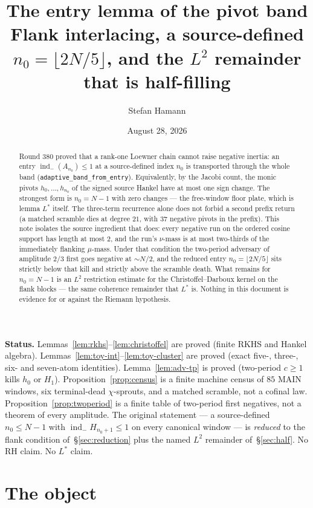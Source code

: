 \documentclass[11pt]{article}
\title{\bfseries The entry lemma of the pivot band\\[2mm]
\large Flank interlacing, a source-defined $n_0=\lfloor 2N/5\rfloor$,
and the $L^2$ remainder that is half-filling}
\author{Stefan Hamann}
\date{August 28, 2026}
\theoremstyle{remark}
\newcommand{\indm}{\operatorname{ind}_{-}}
\begin{document}
\maketitle

\begin{abstract}\noindent
Round 380 proved that a rank-one Loewner chain cannot raise negative
inertia: an entry $\indm(A_{n_0})\le 1$ at a source-defined index
$n_0$ is transported through the whole band
(\texttt{adaptive\_band\_from\_entry}).  Equivalently, by the Jacobi
count, the monic pivots $h_0,\ldots,h_{n_0}$ of the signed source
Hankel have at most one sign change.  The strongest form is
$n_0=N-1$ with zero changes --- the free-window floor plate, which
is lemma $L^*$ itself.  The three-term recurrence alone does not
forbid a second prefix return (a matched scramble dies at degree
$21$, with $37$ negative pivots in the prefix).  This note isolates
the source ingredient that does: every negative run on the ordered
cosine support has length at most $2$, and the run's $\nu$-mass is
at most two-thirds of the immediately flanking $\mu$-mass.  Under
that condition the two-period adversary of amplitude $2/3$ first
goes negative at $\sim N/2$, and the reduced entry
$n_0=\lfloor 2N/5\rfloor$ sits strictly below that kill and strictly
above the scramble death.  What remains for $n_0=N-1$ is an $L^2$
restriction estimate for the Christoffel--Darboux kernel on the
flank blocks --- the same coherence remainder that $L^*$ is.
Nothing in this document is evidence for or against the Riemann
hypothesis.
\end{abstract}

\medskip\noindent
\textbf{Status.}\enspace
Lemmas~\ref{lem:rkhs}--\ref{lem:christoffel} are proved (finite
RKHS and Hankel algebra).
Lemmas~\ref{lem:toy-int}--\ref{lem:toy-cluster} are proved
(exact five-, three-, six- and seven-atom identities).
Lemma~\ref{lem:adv-tp} is proved (two-period $c\ge 1$ kills
$h_0$ or $H_1$).
Proposition~\ref{prop:census} is a finite machine census of $85$
MAIN windows, six terminal-dead $\chi$-sprouts, and a matched
scramble, not a cofinal law.
Proposition~\ref{prop:twoperiod} is a finite table of two-period
first negatives, not a theorem of every amplitude.
The original statement --- a source-defined $n_0\le N-1$ with
$\indm H_{n_0+1}\le 1$ on every canonical window --- is
\emph{reduced} to the flank condition of~\S\ref{sec:reduction}
plus the named $L^2$ remainder of~\S\ref{sec:half}.
No RH claim.  No $L^*$ claim.

\section{The object}\label{sec:obj}
\end{document}
